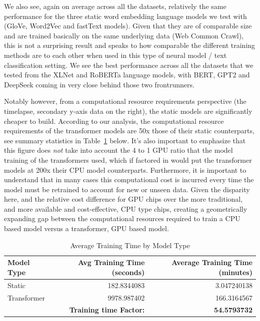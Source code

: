 \documentclass[final]{clv2025-revised}
\begin{document}
We also see, again on average across all the datasets, relatively the same performance for the three static word embedding language models we test with (GloVe, Word2Vec and fastText models). Given that they are of comparable size and are trained basically on the same underlying data (Web Common Crawl), this is not a surprising result and speaks to how comparable the different training methods are to each other when used in this type of neural model / text classification setting. We see the best performance across all the datasets that we tested from the XLNet and RoBERTa language models, with BERT, GPT2 and DeepSeek coming in very close behind those two frontrunners. 

Notably however, from a computational resource requirements perspective (the timelapse, secondary y-axis data on the right), the static models are significantly cheaper to build. According to our analysis, the computational resource requirements of the transformer models are 50x those of their static counterparts, see summary statistics in Table~\ref{tab:avg-training-time-by-model-type} below. It's also important to emphasize that this figure does \textit{not} take into account the 4 to 1 GPU ratio that the model training of the transformers used, which if factored in would put the transformer models at 200x their CPU model counterparts. Furthermore, it is important to understand that in many cases this computational cost is incurred every time the model must be retrained to account for new or unseen data. Given the disparity here, and the relative cost difference for GPU chips over the more traditional, and more available and cost-effective, CPU type chips, creating a geometrically expanding gap between the computational resources required to train a CPU based model versus a transformer, GPU based model.

\begin{table}[h!]
\centering
\small
\caption{Average Training Time by Model Type}
\label{tab:avg-training-time-by-model-type}
\begin{tabular}{lrr}
\toprule
\textbf{Model Type} & \textbf{Avg Training Time (seconds)} & \textbf{Average Training Time (minutes)} \\
\midrule
Static & 182.8344083 & 3.047240138 \\
Transformer & 9978.987402 & 166.3164567 \\
\midrule
& \textbf{Training time Factor:} & \textbf{54.5793732} \\
\bottomrule
\end{tabular}
\end{table}
\end{document}
